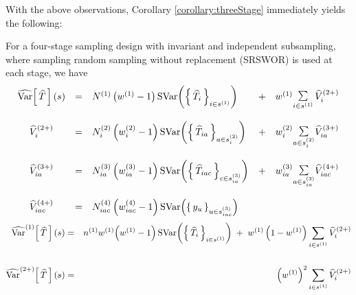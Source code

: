 With the above observations, Corollary \ref{corollary:threeStage} immediately yields the following:
\begin{corollary}\mbox{}\vskip 0.1cm
\noindent
For a four-stage sampling design with invariant and independent subsampling,
where sampling random sampling without replacement (SRSWOR) is used at each stage, we have
\begin{equation*}
\begin{array}{cclcc}
\widehat{\textnormal{Var}}\!\left[\,\widehat{T}\,\right](s)
&=& N^{(1)} \left(w^{(1)}-1\right)\textnormal{SVar}\!\left(\left\{\,\widehat{T}_{i}\,\right\}_{i \in s^{(1)}}\right)
&+& w^{(1)}\underset{i\in s^{(1)}}{\textnormal{\Large$\sum$}}\,\widehat{V}^{(2+)}_{i}
\\ \\
\widehat{V}^{(2+)}_{i}
&=& N^{(2)}_{i} \left(w^{(2)}_{i}-1\right)\textnormal{SVar}\!\left(\left\{\,\widehat{T}_{ia}\,\right\}_{a\in s^{(2)}_{i}}\right)
&+& w^{(2)}_{i}\underset{a \in s^{(2)}_{i}}{\textnormal{\Large$\sum$}}\widehat{V}^{(3+)}_{ia}
\\ \\
\widehat{V}^{(3+)}_{ia}
&=& N^{(3)}_{ia} \left(w^{(3)}_{ia}-1\right)\textnormal{SVar}\!\left(\left\{\,\widehat{T}_{iac}\,\right\}_{c\in s^{(3)}_{ia}}\right)
&+& w^{(3)}_{ia}\underset{a \in s^{(3)}_{ia}}{\textnormal{\Large$\sum$}}\widehat{V}^{(4+)}_{iac}
\\ \\
\widehat{V}^{(4+)}_{iac}
&=& N^{(4)}_{iac} \left(w^{(4)}_{iac}-1\right) \textnormal{SVar}\!\left(\left\{\,y_{u}\,\right\}_{u \in s^{(3)}_{iac}}\right)
\end{array}
\end{equation*}
\begin{eqnarray*}
\widehat{\Var}^{(1)}\!\left[\,\widehat{T}\,\right](s)
&=& n^{(1)}w^{(1)}\!\left(w^{(1)}-1\right)\SVar\!\left(\left\{\,\widehat{T}_{i}\,\right\}_{i \in s^{(1)}}\right)
\;+\;w^{(1)}\left(1 - w^{(1)}\right)\underset{i\in s^{(1)}}{\sum}\,\widehat{V}^{(2+)}_{i}
\\ {\color{white}1} \\
\widehat{\Var}^{(2+)}\!\left[\,\widehat{T}\,\right](s)
&=& \left(w^{(1)}\right)^{2}\underset{i\in s^{(1)}}{\sum}\,\widehat{V}^{(2+)}_{i}
\end{eqnarray*}
\end{corollary}







